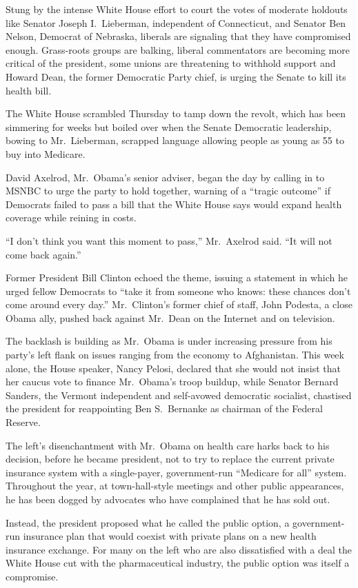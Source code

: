 ﻿\documentclass[12pt]{article}
\begin{document}
Stung by the intense White House effort to court the votes of moderate holdouts like Senator Joseph
I.~Lieberman, independent of Connecticut, and Senator Ben Nelson, Democrat of Nebraska, liberals are
signaling that they have compromised enough. Grass-roots groups are balking, liberal commentators
are becoming more critical of the president, some unions are threatening to withhold support and
Howard Dean, the former Democratic Party chief, is urging the Senate to kill its health bill.

The White House scrambled Thursday to tamp down the revolt, which has been simmering for weeks but
boiled over when the Senate Democratic leadership, bowing to Mr.~Lieberman, scrapped language
allowing people as young as 55 to buy into Medicare.

David Axelrod, Mr.~Obama's senior adviser, began the day by calling in to MSNBC to urge the party to
hold together, warning of a ``tragic outcome'' if Democrats failed to pass a bill that the White
House says would expand health coverage while reining in costs.

``I don't think you want this moment to pass,'' Mr.~Axelrod said. ``It will not come back again.''

Former President Bill Clinton echoed the theme, issuing a statement in which he urged fellow
Democrats to ``take it from someone who knows: these chances don't come around every day.''
Mr.~Clinton's former chief of staff, John Podesta, a close Obama ally, pushed back against Mr.~Dean
on the Internet and on television.

The backlash is building as Mr.~Obama is under increasing pressure from his party's left flank on
issues ranging from the economy to Afghanistan. This week alone, the House speaker, Nancy Pelosi,
declared that she would not insist that her caucus vote to finance Mr.~Obama's troop buildup, while
Senator Bernard Sanders, the Vermont independent and self-avowed democratic socialist, chastised the
president for reappointing Ben S.~Bernanke as chairman of the Federal Reserve.

The left's disenchantment with Mr.~Obama on health care harks back to his decision, before he became
president, not to try to replace the current private insurance system with a single-payer,
government-run ``Medicare for all'' system. Throughout the year, at town-hall-style meetings and
other public appearances, he has been dogged by advocates who have complained that he has sold out.

Instead, the president proposed what he called the public option, a government-run insurance plan
that would coexist with private plans on a new health insurance exchange. For many on the left who
are also dissatisfied with a deal the White House cut with the pharmaceutical industry, the public
option was itself a compromise.
\end{document}
